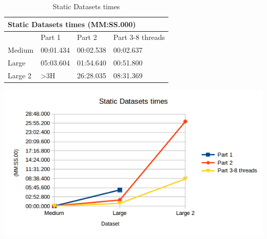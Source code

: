 \documentclass[12pt]{article}
\begin{document}
\begin{table}[H]
\caption{Static Datasets times}
\begin{minipage}{.5\textwidth}
\centering
\footnotesize
\tabcolsep=0.11cm
\label{sdt}
\begin{tabular}{|l|l|l|l|}
\hline
\multicolumn{4}{|l|}{Static Datasets times (MM:SS.000)} \\ \hline
        & Part 1         & Part 2    & Part 3-8 threads \\ \hline
Medium  & 00:01.434      & 00:02.538 & 00:02.637        \\ \hline
Large   & 05:03.604      & 01:54.640 & 00:51.800        \\ \hline
Large 2 & \textgreater3H & 26:28.035 & 08:31.369        \\ \hline
\end{tabular}
\end{minipage}%
\begin{minipage}{.5\textwidth}
\includegraphics[scale=0.5]{StaticDatasets_times.png}
\end{minipage}%
\end{table}
\end{document}
